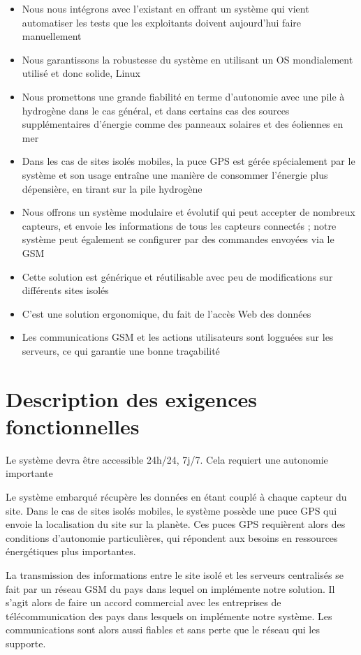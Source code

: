 \begin{itemize}
\item Nous nous intégrons avec l’existant en offrant un système qui vient automatiser les tests que les exploitants doivent aujourd’hui faire manuellement
\item Nous garantissons la robustesse du système en utilisant un OS mondialement utilisé et donc solide, Linux
\item Nous promettons une grande fiabilité en terme d’autonomie avec une pile à hydrogène dans le cas général, et dans certains cas des sources supplémentaires d’énergie comme des panneaux solaires et des éoliennes en mer
\item Dans les cas de sites isolés mobiles, la puce GPS est gérée spécialement par le système et son usage entraîne une manière de consommer l’énergie plus dépensière, en tirant sur la pile hydrogène 
\item Nous offrons un système modulaire et évolutif qui peut accepter de nombreux capteurs, et envoie les informations de tous les capteurs connectés ; notre système peut également se configurer par des commandes envoyées via le GSM
\item Cette solution est générique et réutilisable avec peu de modifications sur différents sites isolés
\item C’est une solution ergonomique, du fait de l’accès Web des données
\item Les communications GSM et les actions utilisateurs sont logguées sur les serveurs, ce qui garantie une bonne traçabilité
\end{itemize}


\section{Description des exigences fonctionnelles}
Le système devra être accessible 24h/24, 7j/7. Cela requiert une autonomie importante

Le système embarqué récupère les données en étant couplé à chaque capteur du site. Dans le cas de sites isolés mobiles, le système possède une puce GPS qui envoie la localisation du site sur la planète. Ces puces GPS requièrent alors des conditions d’autonomie particulières, qui répondent aux besoins en ressources énergétiques plus importantes.

La transmission des informations entre le site isolé et les serveurs centralisés se fait par un réseau GSM du pays dans lequel on implémente notre solution. Il s’agit alors de faire un accord commercial avec les entreprises de télécommunication des pays dans lesquels on implémente notre système. Les communications sont alors aussi fiables et sans perte que le réseau qui les supporte.

